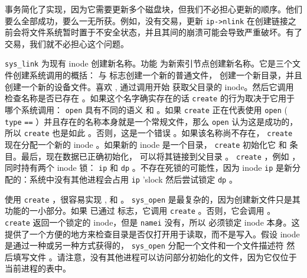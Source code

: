 \documentclass[UTF8]{article}
\begin{document}
事务简化了实现，因为它需要更新多个磁盘块，但我们不必担心更新的顺序。他们要么全部成功，要么一无所获。例如，没有交易，更新
    \lstinline{ip->nlink}    在创建链接之前会将文件系统暂时置于不安全状态，并且其间的崩溃可能会导致严重破坏。有了交易，我们就不必担心这个问题。  

   \lstinline{sys_link}    为现有 inode 创建新名称。功能
        为新索引节点创建新名称。它是三个文件创建系统调用的概括：
        与
        标志创建一个新的普通文件，
        创建一个新目录，并且
        创建一个新的设备文件。喜欢
        ,
        通过调用开始
        获取父目录的 inode。然后它调用
        检查名称是否已存在
        。如果这个名字确实存在的话
    \lstinline{create}    的行为取决于它用于哪个系统调用：
    \lstinline{open}    具有不同的语义
        和
        。如果
    \lstinline{create}    正在代表使用
    \lstinline{open}    (    \lstinline{type}   
    \lstinline{==}   
        ）并且存在的名称本身就是一个常规文件，那么
    \lstinline{open}    认为这是成功的，所以
    \lstinline{create}    也是如此
        。否则，这是一个错误
        。如果该名称尚不存在，
    \lstinline{create}    现在分配一个新的 inode
        。如果新的 inode 是一个目录，
    \lstinline{create}    初始化它
        和
        条目。最后，现在数据已正确初始化，
       可以将其链接到父目录
        。
    \lstinline{create}    ，例如
        ，同时持有两个 inode 锁：
    \lstinline{ip}    和
    \lstinline{dp}   。不存在死锁的可能性，因为 inode
    \lstinline{ip}    是新分配的：系统中没有其他进程会占用
    \lstinline{ip}    'slock 然后尝试锁定
    \lstinline{dp}    。  

使用
    \lstinline{create}    ，很容易实现
        ,
        和
        。
    \lstinline{sys_open}   
        是最复杂的，因为创建新文件只是其功能的一小部分。如果
        已通过
        标志，它调用
    \lstinline{create}   
        。否则，它会调用
        。
    \lstinline{create}    返回一个锁定的 inode，但是
    \lstinline{namei}    没有，所以
        必须锁定 inode 本身。这提供了一个方便的地方来检查目录是否仅打开用于读取，而不是写入。假设 inode 是通过一种或另一种方式获得的，
    \lstinline{sys_open}    分配一个文件和一个文件描述符
        然后填写文件
        。请注意，没有其他进程可以访问部分初始化的文件，因为它仅位于当前进程的表中。  
\end{document}
